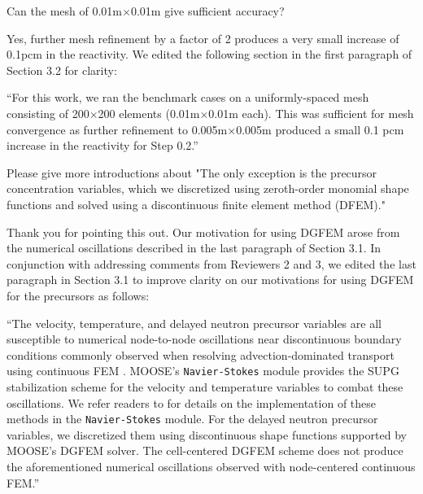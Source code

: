 \documentclass[answers,11pt]{exam}
\begin{document}
\begin{questions}
        \question Can the mesh of 0.01m$\times$0.01m give sufficient accuracy?
        \begin{solution}
        	Yes, further mesh refinement by a factor of 2 produces a very small
        	increase of 0.1pcm in the reactivity. We edited the following
        	section in the first paragraph of Section 3.2 for clarity:
        	
        	``For this work, we ran the benchmark cases on a uniformly-spaced
        	mesh consisting of 200$\times$200 elements (0.01m$\times$0.01m
        	each). This was sufficient for mesh convergence as further
        	refinement to 0.005m$\times$0.005m produced a small 0.1 pcm
        	increase in the reactivity for Step 0.2.''
        \end{solution}

        \question Please give more introductions about "The only exception is
        the precursor concentration variables, which we discretized using
        zeroth-order monomial shape functions and solved using a discontinuous
        finite element method (DFEM)."
        \begin{solution}
        	Thank you for pointing this out. Our motivation for using DGFEM
        	arose from the numerical oscillations described in the last
        	paragraph of Section 3.1. In conjunction with addressing comments
        	from Reviewers 2 and 3, we edited the last paragraph in Section 3.1
        	to improve clarity on our motivations for using DGFEM for the
        	precursors as follows:
        	
        	``The velocity, temperature, and delayed neutron precursor variables are all susceptible to numerical node-to-node oscillations near discontinuous boundary conditions commonly observed when resolving advection-dominated transport using continuous FEM \cite{kuhlmann_lid-driven_2018}. MOOSE's \texttt{Navier-Stokes} module provides the SUPG stabilization scheme \cite{brooks_streamline_1982} for the velocity and temperature variables to combat these oscillations. We refer readers to \cite{peterson_overview_2018} for details on the implementation of these methods in the \texttt{Navier-Stokes} module. For the delayed neutron precursor variables, we discretized them using discontinuous shape functions supported by MOOSE's DGFEM solver. The cell-centered DGFEM scheme does not produce the aforementioned numerical oscillations observed with node-centered continuous FEM.''        	
        	

\end{solution}
\end{questions}
\end{document}
